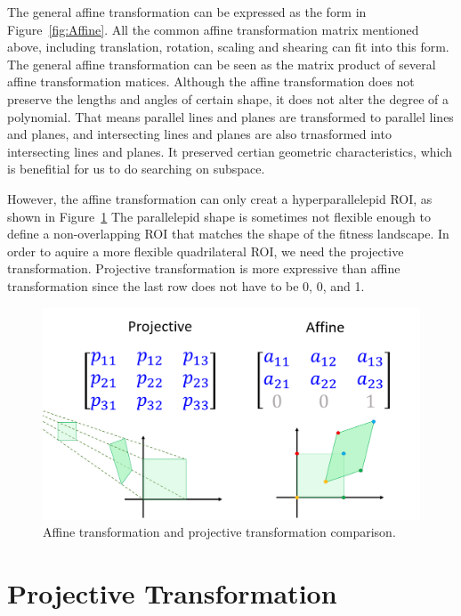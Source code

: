 The general affine transformation can be expressed as the form in Figure~\ref{fig:Affine}.
All the common affine transformation matrix mentioned above, including translation, rotation, scaling and shearing can fit into this form.
The general affine transformation can be seen as the matrix product of several affine transformation matices.
Although the affine transformation does not preserve the lengths and angles of certain shape, it does not alter the degree of a polynomial.
That means parallel lines and planes are transformed to parallel lines and planes, 
and intersecting lines and planes are also trnasformed into intersecting lines and planes.
It preserved certian geometric characteristics, which is benefitial for us to do searching on subspace.


However, the affine transformation can only creat a hyperparallelepid ROI, as shown in Figure~\ref{fig:Affine_vs_Projective}
The parallelepid shape is sometimes not flexible enough to define a non-overlapping ROI that matches the shape of the fitness landscape.
In order to aquire a more flexible quadrilateral ROI, we need the projective transformation.
Projective transformation is more expressive than affine transformation since the last row does not have to be 0, 0, and 1.

\begin{figure}
\centering
\includegraphics[width=\textwidth]{Affine_vs_Projective}
\caption{Affine transformation and projective transformation comparison.}\label{fig:Affine_vs_Projective}
\end{figure} 


\section{Projective Transformation}

